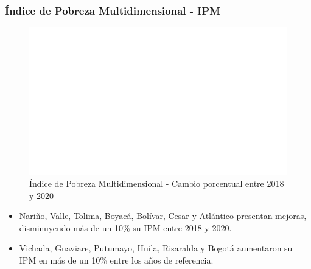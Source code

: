         \subsubsection{Índice de Pobreza Multidimensional - IPM}

    \begin{figure}[H]
        \caption{Índice de Pobreza Multidimensional - Cambio porcentual entre 2018 y 2020 \label{map_result_2} }
        \begin{center}
        \includegraphics[width=\textwidth,keepaspectratio]{img/var_268_map_change.png}
        \end{center}
    \end{figure}
            \begin{itemize}
                    \item Nariño, Valle, Tolima, Boyacá, Bolívar, Cesar y Atlántico presentan mejoras, disminuyendo más de un 10\% su IPM entre 2018 y 2020.
                    \item Vichada, Guaviare, Putumayo, Huila, Risaralda y Bogotá aumentaron su IPM en más de un 10\% entre los años de referencia.
                    \end{itemize}


